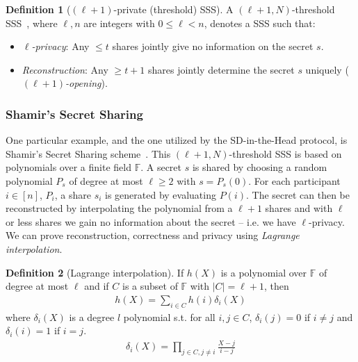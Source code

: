 \documentclass[11pt]{report}
\theoremstyle{definition}
\newtheorem{definition}{Definition}[section]
\theoremstyle{plain}
\begin{document}
\begin{definition}[$(\ell + 1)$-private (threshold) SSS]\label{def:mpc-ss-threshold}
  A $(\ell + 1, N)$-threshold SSS~\cite{cramer2015secure}, where $\ell, n$ are integers with $0 \leq \ell < n$, denotes a SSS such that:
  \begin{itemize}[parsep=0pt, itemsep=0pt]
    \item \textit{$\ell$-privacy}: Any $\leq t$ shares jointly give no information on the secret $s$.
    \item \textit{Reconstruction}: Any $\geq t + 1$ shares jointly determine the secret $s$ uniquely (\textit{$(\ell + 1)$-opening}).
  \end{itemize}
\end{definition}

\subsubsection{Shamir's Secret Sharing}\label{sub:shamir}

One particular example, and the one utilized by the SD-in-the-Head protocol, is Shamir's Secret Sharing scheme~\cite{shamir1979share,cramer2015secure}. This $(\ell + 1, N)$-threshold SSS is based on polynomials over a finite field $\mathbb{F}$. A secret $s$ is shared by choosing a random polynomial $P_s$ of degree at most $\ell \geq 2$ with $s = P_s(0)$. For each participant $i \in [n]$, $P_i$, a share $s_i$ is generated by evaluating $P(i)$. The secret can then be reconstructed by interpolating the polynomial from a $\ell + 1$ shares and with $\ell$ or less shares we gain no information about the secret -- i.e. we have $\ell$-privacy. We can prove reconstruction, correctness and privacy using \textit{Lagrange interpolation}.

\begin{definition}[Lagrange interpolation]\label{def:lagrange}
  If $h(X)$ is a polynomial over $\mathbb{F}$ of degree at most $\ell$ and if $C$ is a subset of $\mathbb{F}$ with $|C| = \ell + 1$, then
  \begin{align}\label{eq:lagrange1}
    h(X) = \sum_{i\in C}h(i)\delta_i(X)
  \end{align}
  where $\delta_i(X)$ is a degree $l$ polynomial s.t. for all $i,j \in C$, $\delta_i(j) = 0$ if $i \neq j$ and $\delta_i(i) = 1$ if $i = j$.
  \begin{align}\label{eq:lagrange2}
    \delta_i(X) = \prod_{j \in C,j\neq i} \frac{X-j}{i-j}
  \end{align}
\end{definition}
\end{document}
